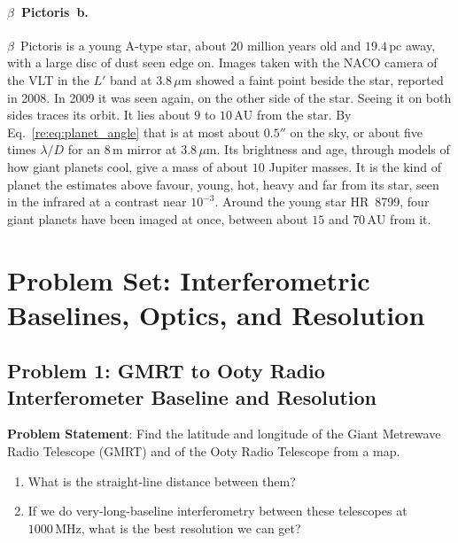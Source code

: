 \paragraph{$\beta$~Pictoris~b.} $\beta$~Pictoris is a young A-type star, about $20$ million years old and $19.4\,\mathrm{pc}$ away, with a large disc of dust seen edge on. Images taken with the NACO camera of the VLT in the $L'$ band at $3.8\,\mu\mathrm m$ showed a faint point beside the star, reported in 2008. In 2009 it was seen again, on the other side of the star. Seeing it on both sides traces its orbit. It lies about $9$ to $10\,\mathrm{AU}$ from the star. By Eq.~\eqref{re:eq:planet_angle} that is at most about $0.5''$ on the sky, or about five times $\lambda/D$ for an $8\,\mathrm m$ mirror at $3.8\,\mu\mathrm m$. Its brightness and age, through models of how giant planets cool, give a mass of about $10$ Jupiter masses. It is the kind of planet the estimates above favour, young, hot, heavy and far from its star, seen in the infrared at a contrast near $10^{-3}$. Around the young star HR~8799, four giant planets have been imaged at once, between about $15$ and $70\,\mathrm{AU}$ from it.

\section{Problem Set: Interferometric Baselines, Optics, and Resolution}

\subsection{Problem 1: GMRT to Ooty Radio Interferometer Baseline and Resolution}
\label{re:prob:gmrt}

\textbf{Problem Statement}: Find the latitude and longitude of the Giant Metrewave Radio Telescope (GMRT) and of the Ooty Radio Telescope from a map.
\begin{enumerate}[label=(\alph*)]
	\item What is the straight-line distance between them?
	\item If we do very-long-baseline interferometry between these telescopes at $1000\,\mathrm{MHz}$, what is the best resolution we can get?
\end{enumerate}

